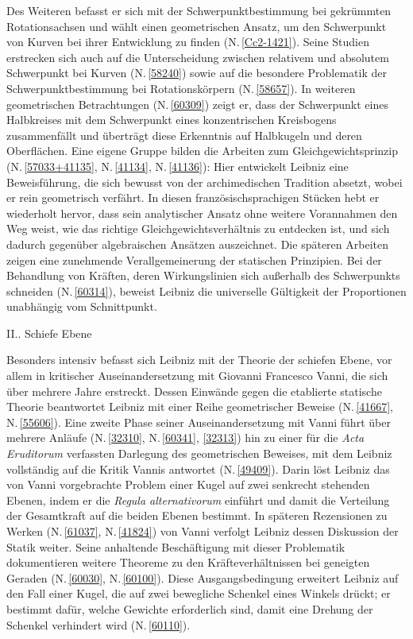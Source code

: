 Des Weiteren befasst er sich mit der Schwerpunktbestimmung bei gekrümmten Rotationsachsen und wählt einen geometrischen Ansatz, um den Schwerpunkt von Kurven bei ihrer Entwicklung zu finden (N.\,\ref{Cc2-1421}). Seine Studien erstrecken sich auch auf die Unterscheidung zwischen relativem und absolutem Schwerpunkt bei Kurven (N.\,\ref{58240}) sowie auf die besondere Problematik der Schwerpunktbestimmung bei Rotationskörpern (N.\,\ref{58657}). In weiteren geometrischen Betrachtungen (N.\,\ref{60309}) zeigt er, dass der Schwerpunkt eines Halbkreises mit dem Schwerpunkt eines konzentrischen Kreisbogens zusammenfällt und überträgt diese Erkenntnis auf Halbkugeln und deren Oberflächen. Eine eigene Gruppe bilden die Arbeiten zum Gleichgewichtsprinzip (N.\,\ref{57033+41135}, N.\,\ref{41134}, N.\,\ref{41136}): Hier entwickelt Leibniz eine Beweisführung, die sich bewusst von der archimedischen Tradition absetzt, wobei er rein geometrisch verfährt. In diesen französischsprachigen Stücken hebt er wiederholt hervor, dass sein analytischer Ansatz ohne weitere Vorannahmen den Weg weist, wie  das richtige Gleichgewichtsverhältnis zu entdecken ist, und sich dadurch gegenüber algebraischen Ansätzen auszeichnet. Die späteren Arbeiten zeigen eine zunehmende Verallgemeinerung der statischen Prinzipien. Bei der Behandlung von Kräften, deren Wirkungslinien sich außerhalb des Schwerpunkts schneiden (N.\,\ref{60314}), beweist Leibniz die universelle Gültigkeit der Proportionen unabhängig vom Schnittpunkt.%
\par
\vspace{1em}
\noindent
II.. Schiefe Ebene%
\par \noindent
Besonders intensiv befasst sich Leibniz mit der Theorie der schiefen Ebene, vor allem in kritischer Auseinandersetzung mit Giovanni Francesco Vanni, die sich über mehrere Jahre erstreckt. Dessen Einwände gegen die etablierte statische Theorie beantwortet Leibniz mit einer Reihe geometrischer Beweise (N.\,\ref{41667}, N.\,\ref{55606}). Eine zweite Phase seiner Auseinandersetzung mit Vanni führt über mehrere Anläufe (N.\,\ref{32310}, N.\,\ref{60341}, \ref{32313}) hin zu einer für die \textit{Acta Eruditorum} verfassten Darlegung des geometrischen Beweises, mit dem Leibniz vollständig auf die Kritik Vannis antwortet (N.\,\ref{49409}). Darin löst Leibniz das von Vanni vorgebrachte Problem einer Kugel auf zwei senkrecht stehenden Ebenen, indem er die \textit{Regula alternativorum} einführt und damit die Verteilung der Gesamtkraft auf die beiden Ebenen bestimmt. In späteren Rezensionen zu Werken (N.\,\ref{61037}, N.\,\ref{41824}) von Vanni verfolgt Leibniz dessen Diskussion der Statik weiter. Seine anhaltende Beschäftigung mit dieser Problematik dokumentieren weitere Theoreme zu den Kräfteverhältnissen bei geneigten Geraden (N.\,\ref{60030}, N.\,\ref{60100}). Diese Ausgangsbedingung erweitert Leibniz auf den Fall einer Kugel, die auf zwei bewegliche Schenkel eines Winkels drückt; er bestimmt dafür, welche Gewichte erforderlich sind, damit eine Drehung der Schenkel verhindert wird (N.\,\ref{60110}).%
